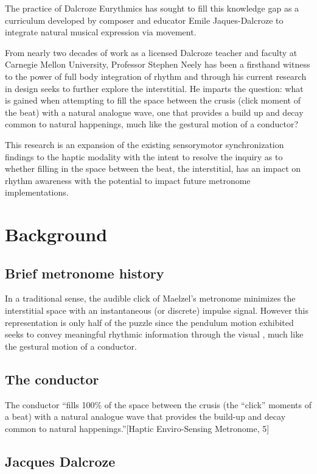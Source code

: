 The practice of Dalcroze Eurythmics has sought to fill this knowledge gap as a curriculum developed by composer and educator Emile Jaques-Dalcroze to integrate natural musical expression via movement.  

From nearly two decades of work as a licensed Dalcroze teacher and faculty at Carnegie Mellon University, Professor Stephen Neely has been a firsthand witness to the power of full body integration of rhythm and through his current research in design seeks to further explore the interstitial. He imparts the question: what is gained when attempting to fill the space between the crusis (click moment of the beat) with a natural analogue wave, one that provides a build up and decay common to natural happenings, much like the gestural motion of a conductor?

This research is an expansion of the existing sensorymotor synchronization findings to the haptic modality with the intent to resolve the inquiry as to whether filling in the space between the beat, the interstitial, has an impact on rhythm awareness with the potential to impact future metronome implementations. 

\section{Background}
\subsection{Brief metronome history}

In a traditional sense, the audible click of Maelzel's metronome minimizes the interstitial space with an instantaneous (or discrete) impulse signal. However this representation is only half of the puzzle since the pendulum motion exhibited seeks to convey meaningful rhythmic information through the visual , much like the gestural motion of a conductor.

\subsection{The conductor}

The conductor ``fills 100\% of the space between the crusis (the “click” moments of a beat) with a natural analogue wave that provides the build-up and decay common to natural happenings.''[Haptic Enviro-Sensing Metronome, 5]

\subsection{Jacques Dalcroze}


